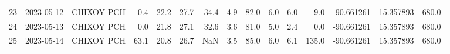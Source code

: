 \documentclass[12pt]{article}
\begin{document}
\begin{center}
\begin{tabular}{lllrrrrrrrrrrrr}
23  & 2023-05-12 &  CHIXOY PCH &     0.4 &  22.2 &   27.7 &  34.4 &        4.9 &     82.0 &  6.0 &         6.0 &         9.0 & -90.661261 &  15.357893 &    680.0 \\
24  & 2023-05-13 &  CHIXOY PCH &     0.0 &  21.8 &   27.1 &  32.6 &        3.6 &     81.0 &  5.0 &         2.4 &         0.0 & -90.661261 &  15.357893 &    680.0 \\
25  & 2023-05-14 &  CHIXOY PCH &    63.1 &  20.8 &   26.7 &   NaN &        3.5 &     85.0 &  6.0 &         6.1 &       135.0 & -90.661261 &  15.357893 &    680.0 \\
\bottomrule
\end{tabular}

        
        \end{center}
        
\end{document}

